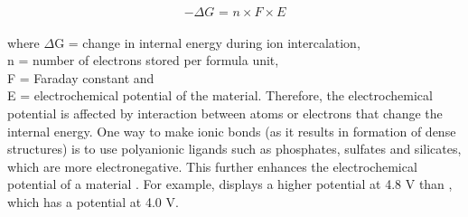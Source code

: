 \begin{equation} \label{eq4}
    -\Delta G \text{ = } n \times F \times E
\end{equation}\\
where $\Delta$G = change in internal energy during ion intercalation,\\
n = number of electrons stored per formula unit,\\
F = Faraday constant and\\
E = electrochemical potential of the material. Therefore, the electrochemical potential is affected by interaction between atoms or electrons that change the internal energy. One way to make ionic bonds (as it results in formation of dense structures) is to use polyanionic ligands such as phosphates, sulfates and silicates, which are more electronegative\cite{liu_understanding_2016}. This further enhances the electrochemical potential of a material \cite{melot_design_2013}. For example,  displays a higher potential at 4.8 V than  \cite{masquelier_polyanionic_2013}, which has a potential at 4.0 V. 

